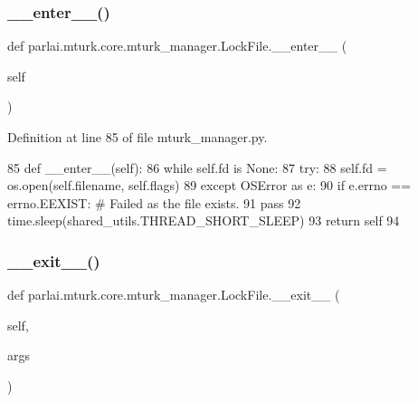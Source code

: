\subsubsection{\texorpdfstring{\+\_\+\+\_\+enter\+\_\+\+\_\+()}{\_\_enter\_\_()}}
{\footnotesize\ttfamily def parlai.\+mturk.\+core.\+mturk\+\_\+manager.\+Lock\+File.\+\_\+\+\_\+enter\+\_\+\+\_\+ (\begin{DoxyParamCaption}\item[{}]{self }\end{DoxyParamCaption})}



Definition at line 85 of file mturk\+\_\+manager.\+py.


\begin{DoxyCode}
85     \textcolor{keyword}{def }\_\_enter\_\_(self):
86         \textcolor{keywordflow}{while} self.fd \textcolor{keywordflow}{is} \textcolor{keywordtype}{None}:
87             \textcolor{keywordflow}{try}:
88                 self.fd = os.open(self.filename, self.flags)
89             \textcolor{keywordflow}{except} OSError \textcolor{keyword}{as} e:
90                 \textcolor{keywordflow}{if} e.errno == errno.EEXIST:  \textcolor{comment}{# Failed as the file exists.}
91                     \textcolor{keywordflow}{pass}
92             time.sleep(shared\_utils.THREAD\_SHORT\_SLEEP)
93         \textcolor{keywordflow}{return} self
94 
\end{DoxyCode}
\mbox{\label{classparlai_1_1mturk_1_1core_1_1mturk__manager_1_1LockFile_ac49e4e875de89ea6e8faaee9179991e8}} 
\subsubsection{\texorpdfstring{\+\_\+\+\_\+exit\+\_\+\+\_\+()}{\_\_exit\_\_()}}
{\footnotesize\ttfamily def parlai.\+mturk.\+core.\+mturk\+\_\+manager.\+Lock\+File.\+\_\+\+\_\+exit\+\_\+\+\_\+ (\begin{DoxyParamCaption}\item[{}]{self,  }\item[{}]{args }\end{DoxyParamCaption})}



